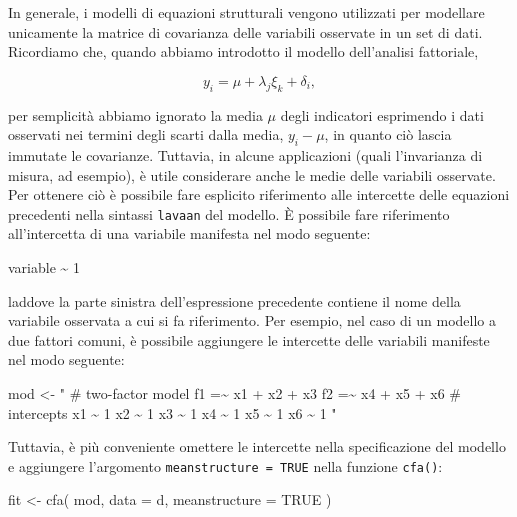 \documentclass[
  11pt,
]{krantz}
\makeatletter
\newenvironment{Shaded}{\begin{snugshade}}{\end{snugshade}}
\newcommand{\AttributeTok}[1]{\textcolor[rgb]{0.61,0.61,0.61}{#1}}
\newcommand{\ConstantTok}[1]{\textcolor[rgb]{0,0,0}{#1}}
\newcommand{\DecValTok}[1]{\textcolor[rgb]{0.06,0.06,0.06}{#1}}
\newcommand{\FunctionTok}[1]{\textcolor[rgb]{0,0,0}{#1}}
\newcommand{\NormalTok}[1]{#1}
\newcommand{\OtherTok}[1]{\textcolor[rgb]{0.37,0.37,0.37}{#1}}
\newcommand{\SpecialCharTok}[1]{\textcolor[rgb]{0,0,0}{#1}}
\newcommand{\StringTok}[1]{\textcolor[rgb]{0.5,0.5,0.5}{#1}}
\newenvironment{kframe}{%
\medskip{}
\setlength{\fboxsep}{.8em}
 \def\at@end@of@kframe{}%
 \ifinner\ifhmode%
  \def\at@end@of@kframe{\end{minipage}}%
  \begin{minipage}{\columnwidth}%
 \fi\fi%
 \def\FrameCommand##1{\hskip\@totalleftmargin \hskip-\fboxsep
 \colorbox{shadecolor}{##1}\hskip-\fboxsep
     \hskip-\linewidth \hskip-\@totalleftmargin \hskip\columnwidth}%
 \MakeFramed {\advance\hsize-\width
   \@totalleftmargin\z@ \linewidth\hsize
   \@setminipage}}%
 {\par\unskip\endMakeFramed%
 \at@end@of@kframe}
\renewenvironment{Shaded}{\begin{kframe}}{\end{kframe}}
\theoremstyle{definition}
\theoremstyle{definition}
\theoremstyle{definition}
\theoremstyle{definition}
\theoremstyle{remark}
\makeatother
\begin{document}
In generale, i modelli di equazioni strutturali vengono utilizzati per modellare unicamente la matrice di covarianza delle variabili osservate in un set di dati. Ricordiamo che, quando abbiamo introdotto il modello dell'analisi fattoriale,

\[
y_i = \mu + \lambda_j \xi_k + \delta_i,
\]

per semplicità abbiamo ignorato la media \(\mu\) degli indicatori esprimendo i dati osservati nei termini degli scarti dalla media, \(y_i -\mu\), in quanto ciò lascia immutate le covarianze. Tuttavia, in alcune applicazioni (quali l'invarianza di misura, ad esempio), è utile considerare anche le medie delle variabili osservate. Per ottenere ciò è possibile fare esplicito riferimento alle intercette delle equazioni precedenti nella sintassi \texttt{lavaan} del modello. È possibile fare riferimento all'intercetta di una variabile manifesta nel modo seguente:

\begin{Shaded}
\begin{Highlighting}[]
\NormalTok{variable }\SpecialCharTok{\textasciitilde{}} \DecValTok{1}
\end{Highlighting}
\end{Shaded}

laddove la parte sinistra dell'espressione precedente contiene il nome della variabile osservata a cui si fa riferimento. Per esempio, nel caso di un modello a due fattori comuni, è possibile aggiungere le intercette delle variabili manifeste nel modo seguente:

\begin{Shaded}
\begin{Highlighting}[]
\NormalTok{mod }\OtherTok{\textless{}{-}} \StringTok{"}
\StringTok{  \# two{-}factor model}
\StringTok{  f1 =\textasciitilde{} x1 + x2 + x3}
\StringTok{  f2 =\textasciitilde{} x4 + x5 + x6}
\StringTok{  \# intercepts}
\StringTok{  x1 \textasciitilde{} 1}
\StringTok{  x2 \textasciitilde{} 1}
\StringTok{  x3 \textasciitilde{} 1}
\StringTok{  x4 \textasciitilde{} 1}
\StringTok{  x5 \textasciitilde{} 1}
\StringTok{  x6 \textasciitilde{} 1}
\StringTok{"}
\end{Highlighting}
\end{Shaded}

Tuttavia, è più conveniente omettere le intercette nella specificazione del modello e aggiungere l'argomento \texttt{meanstructure\ =\ TRUE} nella funzione \texttt{cfa()}:

\begin{Shaded}
\begin{Highlighting}[]
\NormalTok{fit }\OtherTok{\textless{}{-}} \FunctionTok{cfa}\NormalTok{(}
\NormalTok{  mod,}
  \AttributeTok{data =}\NormalTok{ d,}
  \AttributeTok{meanstructure =} \ConstantTok{TRUE}
\NormalTok{)}
\end{Highlighting}
\end{Shaded}
\end{document}
